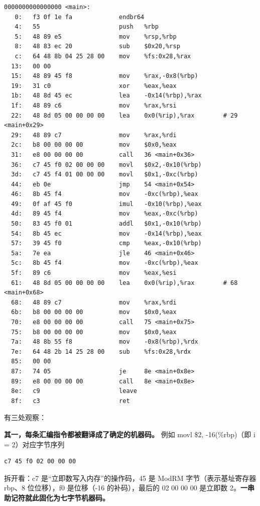 \documentclass[UTF8,a4paper,10pt]{ctexart}
\begin{document}
\begin{lstlisting}[language={[x86masm]Assembler}]
0000000000000000 <main>:
   0:   f3 0f 1e fa             endbr64
   4:   55                      push   %rbp
   5:   48 89 e5                mov    %rsp,%rbp
   8:   48 83 ec 20             sub    $0x20,%rsp
   c:   64 48 8b 04 25 28 00    mov    %fs:0x28,%rax
  13:   00 00
  15:   48 89 45 f8             mov    %rax,-0x8(%rbp)
  19:   31 c0                   xor    %eax,%eax
  1b:   48 8d 45 ec             lea    -0x14(%rbp),%rax
  1f:   48 89 c6                mov    %rax,%rsi
  22:   48 8d 05 00 00 00 00    lea    0x0(%rip),%rax        # 29 <main+0x29>
  29:   48 89 c7                mov    %rax,%rdi
  2c:   b8 00 00 00 00          mov    $0x0,%eax
  31:   e8 00 00 00 00          call   36 <main+0x36>
  36:   c7 45 f0 02 00 00 00    movl   $0x2,-0x10(%rbp)
  3d:   c7 45 f4 01 00 00 00    movl   $0x1,-0xc(%rbp)
  44:   eb 0e                   jmp    54 <main+0x54>
  46:   8b 45 f4                mov    -0xc(%rbp),%eax
  49:   0f af 45 f0             imul   -0x10(%rbp),%eax
  4d:   89 45 f4                mov    %eax,-0xc(%rbp)
  50:   83 45 f0 01             addl   $0x1,-0x10(%rbp)
  54:   8b 45 ec                mov    -0x14(%rbp),%eax
  57:   39 45 f0                cmp    %eax,-0x10(%rbp)
  5a:   7e ea                   jle    46 <main+0x46>
  5c:   8b 45 f4                mov    -0xc(%rbp),%eax
  5f:   89 c6                   mov    %eax,%esi
  61:   48 8d 05 00 00 00 00    lea    0x0(%rip),%rax        # 68 <main+0x68>
  68:   48 89 c7                mov    %rax,%rdi
  6b:   b8 00 00 00 00          mov    $0x0,%eax
  70:   e8 00 00 00 00          call   75 <main+0x75>
  75:   b8 00 00 00 00          mov    $0x0,%eax
  7a:   48 8b 55 f8             mov    -0x8(%rbp),%rdx
  7e:   64 48 2b 14 25 28 00    sub    %fs:0x28,%rdx
  85:   00 00
  87:   74 05                   je     8e <main+0x8e>
  89:   e8 00 00 00 00          call   8e <main+0x8e>
  8e:   c9                      leave
  8f:   c3                      ret
\end{lstlisting}

有三处观察：

\noindent\textbf{其一，每条汇编指令都被翻译成了确定的机器码。} 例如 movl \$2, -16(\%rbp)（即 i = 2）对应字节序列

\begin{lstlisting}
c7 45 f0 02 00 00 00
\end{lstlisting}

拆开看：c7 是“立即数写入内存”的操作码，45 是 ModRM 字节（表示基址寄存器 rbp、8 位位移），f0 是位移（-16 的补码），最后的 02 00 00 00 是立即数 2。\textbf{一串助记符就此固化为七字节机器码。}
\end{document}

